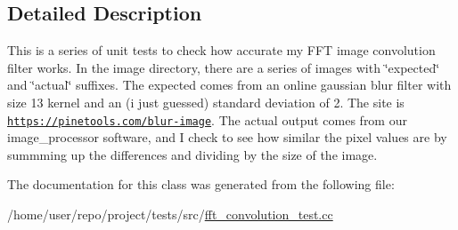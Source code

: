 \subsection{Detailed Description}
This is a series of unit tests to check how accurate my F\+FT image convolution filter works. In the image directory, there are a series of images with \char`\"{}expected\char`\"{} and \char`\"{}actual\char`\"{} suffixes. The expected comes from an online gaussian blur filter with size 13 kernel and an (i just guessed) standard deviation of 2. The site is \href{https://pinetools.com/blur-image}{\tt https\+://pinetools.\+com/blur-\/image}. The actual output comes from our image\+\_\+processor software, and I check to see how similar the pixel values are by summming up the differences and dividing by the size of the image. 

The documentation for this class was generated from the following file\+:\begin{DoxyCompactItemize}
\item 
/home/user/repo/project/tests/src/\hyperlink{fft__convolution__test_8cc}{fft\+\_\+convolution\+\_\+test.\+cc}\end{DoxyCompactItemize}
